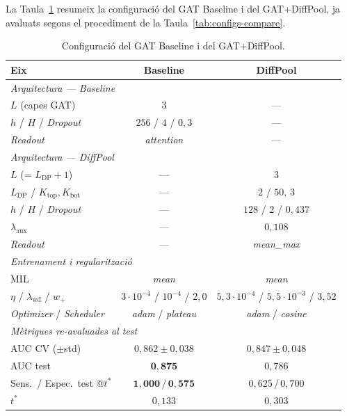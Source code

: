 \documentclass[10pt,a4paper,twocolumn,twoside]{article}
\begin{document}
La Taula~\ref{tab:best-params} resumeix la configuració del GAT Baseline i del GAT+DiffPool,
ja avaluats segons el procediment de la Taula~\ref{tab:configs-compare}.

\begin{table}[H]
\centering
\caption{Configuració del GAT Baseline i del GAT+DiffPool.}
\label{tab:best-params}
\small
\begin{tabular}{lcc}
\toprule
\textbf{Eix} & \textbf{Baseline} & \textbf{DiffPool} \\
\midrule
\multicolumn{3}{l}{\textit{Arquitectura --- Baseline}} \\[2pt]
$L$ (capes GAT)                          & $3$                      & --- \\
$h$ / $H$ / \textit{Dropout}             & $256$ / $4$ / $0{,}3$    & --- \\
\textit{Readout}                         & \textit{attention}       & --- \\
\midrule
\multicolumn{3}{l}{\textit{Arquitectura --- DiffPool}} \\[2pt]
$L$ (= $L_{\text{DP}}+1$)               & ---                      & $3$ \\
$L_{\text{DP}}$ / $K_{\text{top}},K_{\text{bot}}$ & ---           & $2$ / $50,\,3$ \\
$h$ / $H$ / \textit{Dropout}             & ---                      & $128$ / $2$ / $0{,}437$ \\
$\lambda_{\text{aux}}$                   & ---                      & $0{,}108$ \\
\textit{Readout}                         & ---                      & \textit{mean\_max} \\
\midrule
\multicolumn{3}{l}{\textit{Entrenament i regularització}} \\[2pt]
MIL                                      & \textit{mean}            & \textit{mean} \\
$\eta$ / $\lambda_{\text{wd}}$ / $w_+$   & $3\!\cdot\!10^{-4}$ / $10^{-4}$ / $2{,}0$ & $5{,}3\!\cdot\!10^{-4}$ / $5{,}5\!\cdot\!10^{-3}$ / $3{,}52$ \\
\textit{Optimizer} / \textit{Scheduler}  & \textit{adam} / \textit{plateau} & \textit{adam} / \textit{cosine} \\
\midrule
\multicolumn{3}{l}{\textit{Mètriques re-avaluades al test}} \\[2pt]
AUC CV ($\pm$std)                        & $0{,}862\!\pm\!0{,}038$  & $0{,}847\!\pm\!0{,}048$ \\
AUC test                                 & $\mathbf{0{,}875}$       & $0{,}786$ \\
Sens.\ / Espec.\ test @$t^*$             & $\mathbf{1{,}000\,/\,0{,}575}$ & $0{,}625\,/\,0{,}700$ \\
$t^*$                                    & $0{,}133$                & $0{,}303$ \\
\bottomrule
\end{tabular}
\end{table}
\end{document}
